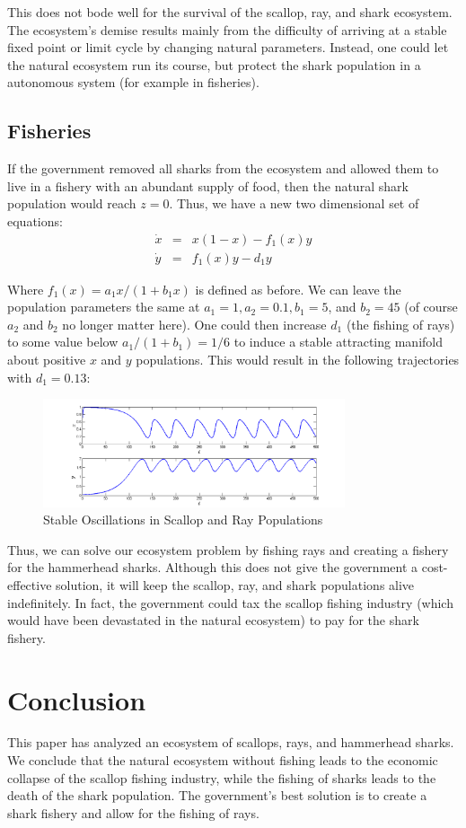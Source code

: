 \documentclass[12pt,journal,compsoc,twoside]{IEEEtran}
\begin{document}
This does not bode well for the survival of the scallop, ray, and shark ecosystem. The ecosystem's demise results mainly from the difficulty of arriving at a stable fixed point or limit cycle by changing natural parameters. Instead, one could let the natural ecosystem run its course, but protect the shark population in a autonomous system (for example in fisheries).

\subsection{Fisheries}

If the government removed all sharks from the ecosystem and allowed them to live in a fishery with an abundant supply of food, then the natural shark population would reach $z = 0$. Thus, we have a new two dimensional set of equations:
\begin{eqnarray}
\dot{x} &=& x(1-x) - f_1(x)y \nonumber \\
\dot{y} &=& f_1(x) y - d_1 y 
\end{eqnarray}

Where $f_1(x) = a_1 x /(1+ b_1 x)$ is defined as before. We can leave the population parameters the same at $a_1 = 1, a_2 = 0.1, b_1 = 5$, and $b_2 = 45$ (of course $a_2$ and $b_2$ no longer matter here). One could then increase $d_1$ (the fishing of rays) to some value below $a_1 / (1 + b_1) = 1/6$ to induce a stable attracting manifold about positive $x$ and $y$ populations. This would result in the following trajectories with $d_1 = 0.13$:
\begin{figure}[h!]
\centering
\includegraphics[width=3.5in]{success.png}
\caption{Stable Oscillations in Scallop and Ray Populations}
\label{success}
\end{figure}

Thus, we can solve our ecosystem problem by fishing rays and creating a fishery for the hammerhead sharks. Although this does not give the government a cost-effective solution, it will keep the scallop, ray, and shark populations alive indefinitely. In fact, the government could tax the scallop fishing industry (which would have been devastated in the natural ecosystem) to pay for the shark fishery. 

\section{Conclusion}

This paper has analyzed an ecosystem of scallops, rays, and hammerhead sharks. We conclude that the natural ecosystem without fishing leads to the economic collapse of the scallop fishing industry, while the fishing of sharks leads to the death of the shark population. The government's best solution is to create a shark fishery and allow for the fishing of rays. 



\nocite{*}
\end{document}

